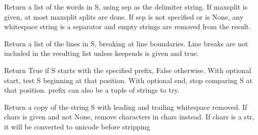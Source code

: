 \documentclass[letterpaper,10pt,english]{sphinxmanual}
\begin{document}
\begin{fulllineitems}

\begin{fulllineitems}
\label{api_reference:textblob_de.blob.Word.split}
Return a list of the words in S, using sep as the
delimiter string.  If maxsplit is given, at most maxsplit
splits are done. If sep is not specified or is None, any
whitespace string is a separator and empty strings are
removed from the result.

\end{fulllineitems}


\begin{fulllineitems}
\label{api_reference:textblob_de.blob.Word.splitlines}
Return a list of the lines in S, breaking at line boundaries.
Line breaks are not included in the resulting list unless keepends
is given and true.

\end{fulllineitems}


\begin{fulllineitems}
\label{api_reference:textblob_de.blob.Word.startswith}
Return True if S starts with the specified prefix, False otherwise.
With optional start, test S beginning at that position.
With optional end, stop comparing S at that position.
prefix can also be a tuple of strings to try.

\end{fulllineitems}


\begin{fulllineitems}
\label{api_reference:textblob_de.blob.Word.strip}
Return a copy of the string S with leading and trailing
whitespace removed.
If chars is given and not None, remove characters in chars instead.
If chars is a str, it will be converted to unicode before stripping


\end{fulllineitems}
\end{fulllineitems}
\end{document}
